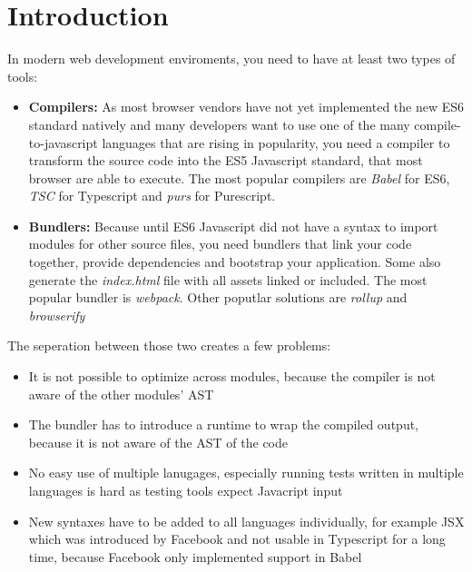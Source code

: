 \section{Introduction}

In modern web development enviroments, you need to have at least two types of tools:

\begin{itemize}

\item{\textbf{Compilers:} As most browser vendors have not yet implemented the new ES6 standard natively and many developers want to use one of the many compile-to-javascript languages that are rising in popularity, you need a compiler to transform the source code into the ES5 Javascript standard, that most browser are able to execute. The most popular compilers are \textit{Babel} for ES6, \textit{TSC} for Typescript and \textit{purs} for Purescript.}

\item{\textbf{Bundlers:} Because until ES6 Javascript did not have a syntax to import modules for other source files, you need bundlers that link your code together, provide dependencies and bootstrap your application. Some also generate the \textit{index.html} file with all assets linked or included. The most popular bundler is \textit{webpack}. Other poputlar solutions are \textit{rollup} and \textit{browserify}}

\end{itemize}

The seperation between those two creates a few problems:

\begin{itemize}
\item{It is not possible to optimize across modules, because the compiler is not aware of the other modules' AST}

\item{The bundler has to introduce a runtime to wrap the compiled output, because it is not aware of the AST of the code}

\item{No easy use of multiple lanugages, especially running tests written in multiple languages is hard as testing tools expect Javacript input}

\item{New syntaxes have to be added to all languages individually, for example JSX which was introduced by Facebook and not usable in Typescript for a long time, because Facebook only implemented support in Babel}

\end{itemize}

